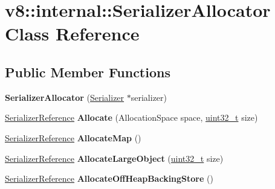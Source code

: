 \hypertarget{classv8_1_1internal_1_1SerializerAllocator}{}\section{v8\+:\+:internal\+:\+:Serializer\+Allocator Class Reference}
\label{classv8_1_1internal_1_1SerializerAllocator}
\subsection*{Public Member Functions}
\begin{DoxyCompactItemize}
\item 
\mbox{\label{classv8_1_1internal_1_1SerializerAllocator_abd7060c40ae48fa3ea767e1b5da60b9a}} 
{\bfseries Serializer\+Allocator} (\mbox{\hyperlink{classv8_1_1internal_1_1Serializer}{Serializer}} $\ast$serializer)
\item 
\mbox{\label{classv8_1_1internal_1_1SerializerAllocator_ad2ca91cb7eb86fef0110461698b16083}} 
\mbox{\hyperlink{classv8_1_1internal_1_1SerializerReference}{Serializer\+Reference}} {\bfseries Allocate} (Allocation\+Space space, \mbox{\hyperlink{classuint32__t}{uint32\+\_\+t}} size)
\item 
\mbox{\label{classv8_1_1internal_1_1SerializerAllocator_aaaadd6cadf217674cca0f04747d430c6}} 
\mbox{\hyperlink{classv8_1_1internal_1_1SerializerReference}{Serializer\+Reference}} {\bfseries Allocate\+Map} ()
\item 
\mbox{\label{classv8_1_1internal_1_1SerializerAllocator_aff4b16323cf2662dab9abe7c4c9323fb}} 
\mbox{\hyperlink{classv8_1_1internal_1_1SerializerReference}{Serializer\+Reference}} {\bfseries Allocate\+Large\+Object} (\mbox{\hyperlink{classuint32__t}{uint32\+\_\+t}} size)
\item 
\mbox{\label{classv8_1_1internal_1_1SerializerAllocator_acf275fe1b7756872c58f62ce9021684e}} 
\mbox{\hyperlink{classv8_1_1internal_1_1SerializerReference}{Serializer\+Reference}} {\bfseries Allocate\+Off\+Heap\+Backing\+Store} ()
\item 

\end{DoxyCompactItemize}
